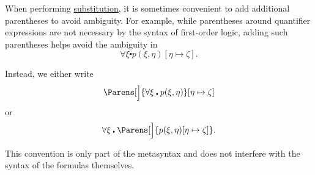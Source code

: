 \begin{remark}\label{remark:first_order_substitution_parentheses}
  When performing \hyperref[def:propositional_substitution]{substitution}, it is sometimes convenient to add additional parentheses to avoid ambiguity. For example, while parentheses around quantifier expressions are not necessary by the syntax of first-order logic, adding such parentheses helps avoid the ambiguity in
  \begin{equation*}
    \forall \xi \centerdot p(\xi, \eta) [\eta \mapsto \zeta].
  \end{equation*}

  Instead, we either write
  \begin{equation*}
    \Parens[\Big]{ \forall \xi \centerdot p(\xi, \eta) } [\eta \mapsto \zeta]
  \end{equation*}
  or
  \begin{equation*}
    \forall \xi \centerdot \Parens[\Big]{ p(\xi, \eta)[\eta \mapsto \zeta] }.
  \end{equation*}

  This convention is only part of the metasyntax and does not interfere with the syntax of the formulas themselves.
\end{remark}

